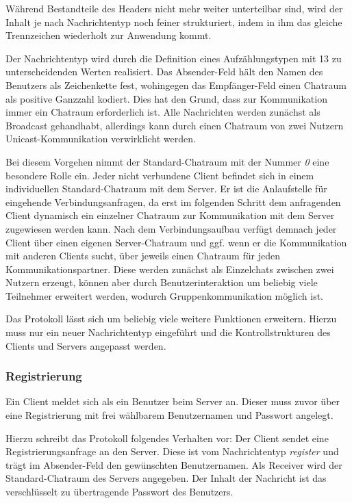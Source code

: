 \documentclass[12pt,a4paper,bibliography=totocnumbered,listof=totocnumbered]{scrartcl}
\begin{document}
Während Bestandteile des Headers nicht mehr weiter unterteilbar sind, wird der Inhalt je nach Nachrichtentyp noch feiner strukturiert, indem in ihm das gleiche Trennzeichen wiederholt zur Anwendung kommt.

Der Nachrichtentyp wird durch die Definition eines Aufzählungstypen mit 13 zu unterscheidenden Werten realisiert. Das Absender-Feld hält den Namen des Benutzers als Zeichenkette fest, wohingegen das Empfänger-Feld einen Chatraum als positive Ganzzahl kodiert. Dies hat den Grund, dass zur Kommunikation immer ein Chatraum erforderlich ist. Alle Nachrichten werden zunächst als Broadcast gehandhabt, allerdings kann durch einen Chatraum von zwei Nutzern Unicast-Kommunikation verwirklicht werden. 

Bei diesem Vorgehen nimmt der Standard-Chatraum mit der Nummer \textit{0} eine besondere Rolle ein. Jeder nicht verbundene Client befindet sich in einem individuellen Standard-Chatraum mit dem Server. Er ist die Anlaufstelle für eingehende Verbindungsanfragen, da erst im folgenden Schritt dem anfragenden Client dynamisch ein einzelner Chatraum zur Kommunikation mit dem Server zugewiesen werden kann. Nach dem Verbindungsaufbau verfügt demnach jeder Client über einen eigenen Server-Chatraum und ggf. wenn er die Kommunikation mit anderen Clients sucht, über jeweils einen Chatraum für jeden Kommunikationspartner. Diese werden zunächst als Einzelchats zwischen zwei Nutzern erzeugt, können aber durch Benutzerinteraktion um beliebig viele Teilnehmer erweitert werden, wodurch Gruppenkommunikation möglich ist.

Das Protokoll lässt sich um beliebig viele weitere Funktionen erweitern. Hierzu muss nur ein neuer Nachrichtentyp eingeführt und die Kontrollstrukturen des Clients und Servers angepasst werden.

\subsubsection{Registrierung}
Ein Client meldet sich als ein Benutzer beim Server an. Dieser muss zuvor über eine Registrierung mit frei wählbarem Benutzernamen und Passwort angelegt.

Hierzu schreibt das Protokoll folgendes Verhalten vor: 
Der Client sendet eine Registrierungsanfrage an den Server. Diese ist vom Nachrichtentyp \textit{register} und trägt im Absender-Feld den gewünschten Benutzernamen. Als Receiver wird der Standard-Chatraum des Servers angegeben. Der Inhalt der Nachricht ist das verschlüsselt zu übertragende Passwort des Benutzers.
\end{document}
